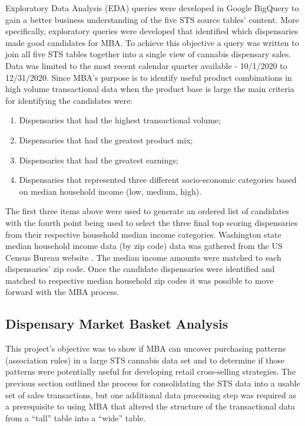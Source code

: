 \documentclass[../article.tex, 12pt]{subfiles}
\begin{document}
\begin{multicols*}{2}
\par
Exploratory Data Analysis (EDA) queries were developed in Google BigQuery to gain a better business understanding of the five STS source tables' content. More specifically, exploratory queries were developed that identified which dispensaries made good candidates for MBA. To achieve this objective a query was written to join all five STS tables together into a single view of cannabis dispensary sales. Data was limited to the most recent calendar quarter available - 10/1/2020 to 12/31/2020. Since MBA's purpose is to identify useful product combinations in high volume transactional data when the product base is large \citep{agrawal1993mining} the main criteria for identifying the candidates were:
\begin{enumerate}
\item Dispensaries that had the highest transactional volume;
\item Dispensaries that had the greatest product mix;
\item Dispensaries that had the greatest earnings;
\item Dispensaries that represented three different socio-economic categories based on median household income (low, medium, high).
\end{enumerate}

The first three items above were used to generate an ordered list of candidates with the fourth point being used to select the three final top scoring dispensaries from their respective household median income categories. Washington state median household income data (by zip code) data was gathered from the US Census Bureau website \citep{medianincome}. The median income amounts were matched to each dispensaries' zip code. Once the candidate dispensaries were identified and matched to respective median household zip codes it was possible to move forward with the MBA process.

\subsection{Dispensary Market Basket Analysis}

This project's objective was to show if MBA can uncover purchasing patterns (association rules) in a large STS cannabis data set and to determine if those patterns were potentially useful for developing retail cross-selling strategies. The previous section outlined the process for consolidating the STS data into a usable set of sales transactions, but one additional data processing step was required as a prerequisite to using MBA that altered the structure of the transactional data from a ``tall'' table into a ``wide'' table.


\end{multicols*}
\end{document}
